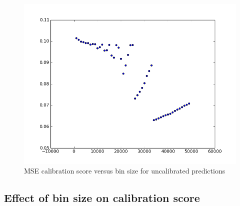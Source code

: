 \begin{figure}[t]
  \includegraphics[width=\linewidth]{uncalibrated_binsize_score.png}
  \caption{MSE calibration score versus bin size for uncalibrated predictions}
  \label{fig:binsize_score_uncalib}
\endminipage
\end{figure}


\subsection{Effect of bin size on calibration score}

